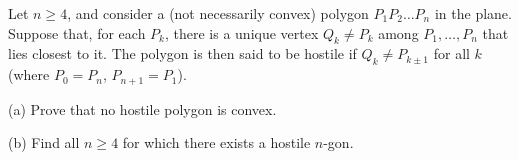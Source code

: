 Let $n \geq 4$,  and consider a (not necessarily convex) polygon $P_1P_2\hdots P_n$ in the plane. Suppose that, for each $P_k$,  there is a unique vertex $Q_k\ne P_k$ among $P_1,\hdots, P_n$ that lies closest to it. The polygon is then said to be hostile if $Q_k\ne P_{k\pm 1}$ for all $k$ (where $P_0 = P_n$,  $P_{n+1} = P_1$).

(a) Prove that no hostile polygon is convex.

(b) Find all $n \geq 4$ for which there exists a hostile $n$-gon.